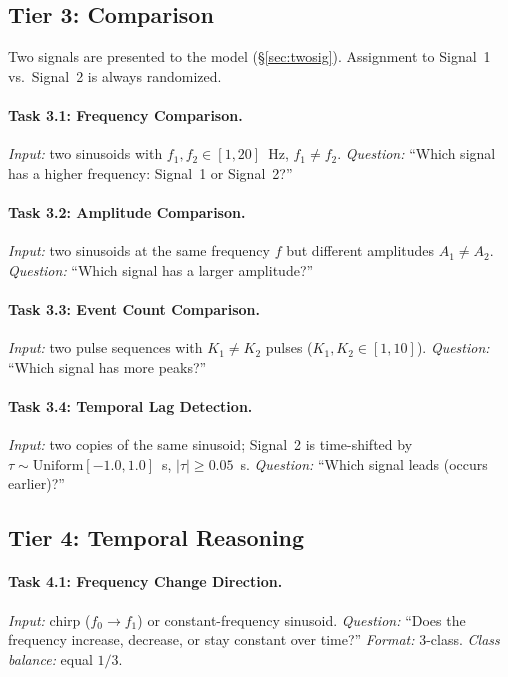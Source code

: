 \documentclass[11pt]{article}
\begin{document}
\subsection{Tier 3: Comparison}

Two signals are presented to the model (\S\ref{sec:twosig}). Assignment to Signal~1 vs.\ Signal~2 is always randomized.

\paragraph{Task 3.1: Frequency Comparison.}
\emph{Input:} two sinusoids with $f_1, f_2 \in [1,20]$~Hz, $f_1 \neq f_2$.
\emph{Question:} ``Which signal has a higher frequency: Signal~1 or Signal~2?''

\paragraph{Task 3.2: Amplitude Comparison.}
\emph{Input:} two sinusoids at the same frequency $f$ but different amplitudes $A_1 \neq A_2$.
\emph{Question:} ``Which signal has a larger amplitude?''

\paragraph{Task 3.3: Event Count Comparison.}
\emph{Input:} two pulse sequences with $K_1 \neq K_2$ pulses ($K_1, K_2 \in [1,10]$).
\emph{Question:} ``Which signal has more peaks?''

\paragraph{Task 3.4: Temporal Lag Detection.}
\emph{Input:} two copies of the same sinusoid; Signal~2 is time-shifted by $\tau \sim \mathrm{Uniform}[-1.0,1.0]$~s, $|\tau| \geq 0.05$~s.
\emph{Question:} ``Which signal leads (occurs earlier)?''

\subsection{Tier 4: Temporal Reasoning}

\paragraph{Task 4.1: Frequency Change Direction.}
\emph{Input:} chirp ($f_0 \to f_1$) or constant-frequency sinusoid.
\emph{Question:} ``Does the frequency increase, decrease, or stay constant over time?''
\emph{Format:} 3-class. \emph{Class balance:} equal $1/3$.
\end{document}

